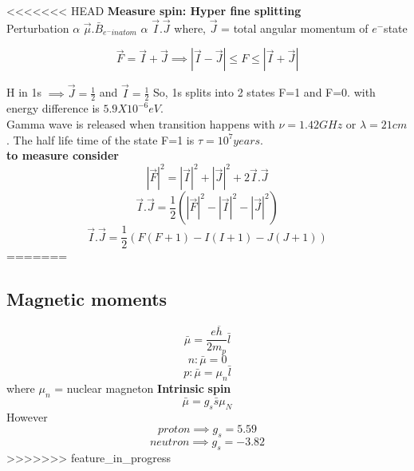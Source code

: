<<<<<<< HEAD
\textbf{Measure spin: Hyper fine splitting}\\
Perturbation $\alpha$ \(\vec{\mu}.\bar{B}_{e^- in atom}\) $\alpha$ \(\vec{I}.\vec{J}\) where, \(\vec{J}\) = total angular momentum of $e^- $state
\begin{definition}
    \[
        \vec{F} = \vec{I}+ \vec{J} \implies 
        \left\vert \vec{I}- \vec{J} \right\vert \leq F \leq \left\vert \vec{I}+ \vec{J} \right\vert 
    \]
\end{definition}

H in 1s \(\implies \vec{J} = \frac{1}{2}\) and \(\vec{I} = \frac{1}{2}\)
So, 1s splits into 2 states F=1 and F=0. with energy difference is $5.9 X 10^{-6} eV. $\\
Gamma wave is released when transition happens with \(\nu = 1.42 GHz\) or \(\lambda = 21cm\). The half life time of the state F=1 is \(\tau = 10^7 years\). \\
\textbf{to measure consider}  
\[
    \left\vert \vec{F} \right\vert^2 = \left\vert \vec{I} \right\vert^2 + \left\vert \vec{J} \right\vert^2 + 2\vec{I}.\vec{J}
\]
\[
    \vec{I}.\vec{J} = \frac{1}{2} (\left\vert \vec{F} \right\vert^2 -\left\vert \vec{I} \right\vert^2 - \left\vert \vec{J} \right\vert^2 )
\]
\[
    \vec{I}.\vec{J} = \frac{1}{2}(F(F+1)-I(I+1)-J(J+1))
\]
\[

\]
=======
\subsection{Magnetic moments}
\[
    \bar{\mu} = \frac{e \overline{h} }{2 m_{p} } \bar{l}
\]
\[
    n: \bar{\mu} = 0
\]
\[
    p: \bar{\mu} = \mu_n \bar{l}
\]
where $\mu_n$ = nuclear magneton\adfj
\textbf{Intrinsic}  \textbf{spin} 
\[
    \bar{\mu} = g_{s} \bar{s} \mu_{N} 
\]
However
\[
    proton \implies  g_s = 5.59
\]
\[
    neutron \implies g_s = -3.82
\]
>>>>>>> feature_in_progress
